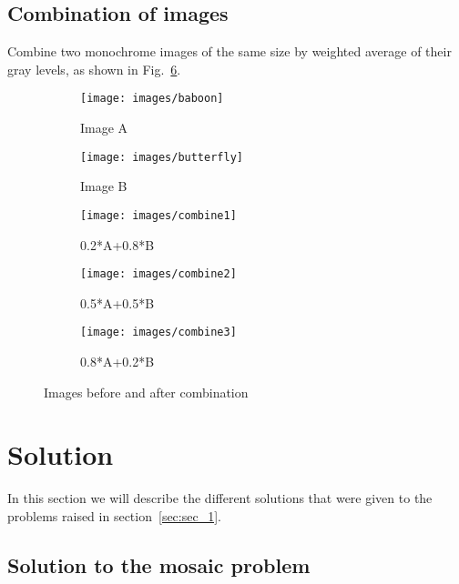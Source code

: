 \documentclass[journal]{IEEEtran}
\begin{document}
\subsection{Combination of images}
\label{sub_sec:combination}
Combine two monochrome images of the same size by weighted average of their gray levels, as shown in Fig.~\ref{fig:combine_example}.

\begin{figure}
	
	\centering
	\begin{subfigure}{0.16\textwidth}
		\centering
		\texttt{[image: images/baboon]} 
		\caption{Image A}
		\label{fig:combine_example1}
	\end{subfigure}
	\centering
	\begin{subfigure}{0.16\textwidth}
		\centering
		\texttt{[image: images/butterfly]}
		\caption{Image B}
		\label{fig:combine_example2}
	\end{subfigure}

	\centering
	\begin{subfigure}{0.14\textwidth}
		\centering
		\texttt{[image: images/combine1]} 
		\caption{0.2*A+0.8*B}
		\label{fig:combine_example_final1}
	\end{subfigure}
	\centering
	\begin{subfigure}{0.14\textwidth}
		\centering
		\texttt{[image: images/combine2]}
		\caption{0.5*A+0.5*B}
		\label{fig:combine_example_final2}
	\end{subfigure}
	\centering
	\begin{subfigure}{0.14\textwidth}
		\centering
		\texttt{[image: images/combine3]}
		\caption{0.8*A+0.2*B}
		\label{fig:combine_example_final3}
	\end{subfigure}

	\caption{Images before and after combination}
	\label{fig:combine_example}
\end{figure}


\section{Solution}

In this section we will describe the different solutions that were given to the problems raised in section~\ref{sec:sec_1}.

\subsection{Solution to the mosaic problem}
\label{sub_sec:solution:mosaic}
\end{document}
